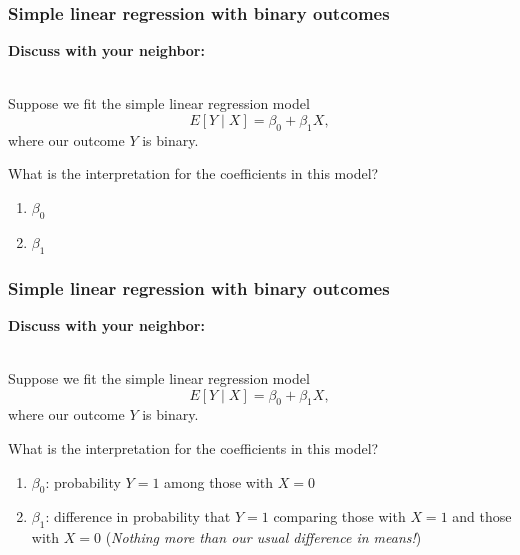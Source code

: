 \documentclass[10pt,t]{beamer}
\begin{document}
\begin{frame}
	\frametitle{Simple linear regression with binary outcomes}
	\textbf{Discuss with your neighbor:} 
	\\ ~\ 
	
	Suppose we fit the simple linear regression model $$E[Y \mid X] = \beta_0 + \beta_1 X,$$ where our outcome $Y$ is binary.
	
	What is the interpretation for the coefficients in this model?
	
	\begin{enumerate}
			\item $\beta_0$
			\item $\beta_1$
		\end{enumerate} 
\end{frame}

\begin{frame}
	\frametitle{Simple linear regression with binary outcomes}
	\textbf{Discuss with your neighbor:} 
	\\ ~\ 
	
	Suppose we fit the simple linear regression model $$E[Y \mid X] = \beta_0 + \beta_1 X,$$ where our outcome $Y$ is binary.
	
	What is the interpretation for the coefficients in this model?
	
	\begin{enumerate}
		\item $\beta_0$: probability $Y = 1$ among those with $X = 0$
		\item $\beta_1$: difference in probability that $Y = 1$ comparing those with $X = 1$ and those with $X = 0$ \footnotesize{(\textit{Nothing more than our usual difference in means!})}
	\end{enumerate} 
\end{frame}
\end{document}
